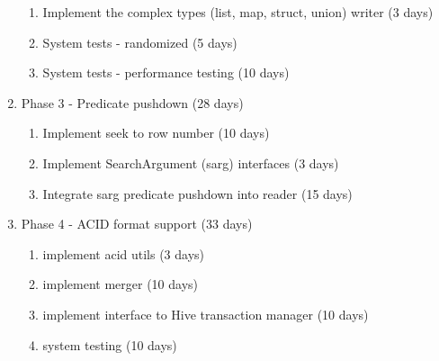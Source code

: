 \documentclass{article}
\begin{document}
\begin{enumerate}
\begin{enumerate}
  \item Implement the complex types (list, map, struct, union) writer (3 days)
  \item System tests - randomized (5 days)
  \item System tests - performance testing (10 days)
  \end{enumerate}
\item{Phase 3 - Predicate pushdown (28 days)}
  \begin{enumerate}
  \item Implement seek to row number (10 days)
  \item Implement SearchArgument (sarg) interfaces (3 days)
  \item Integrate sarg predicate pushdown into reader (15 days)
  \end{enumerate}
\item{Phase 4 - ACID format support (33 days)}
  \begin{enumerate}
  \item implement acid utils (3 days)
  \item implement merger (10 days)
  \item implement interface to Hive transaction manager (10 days)
  \item system testing (10 days)
  \end{enumerate}
\end{enumerate}
\end{document}
